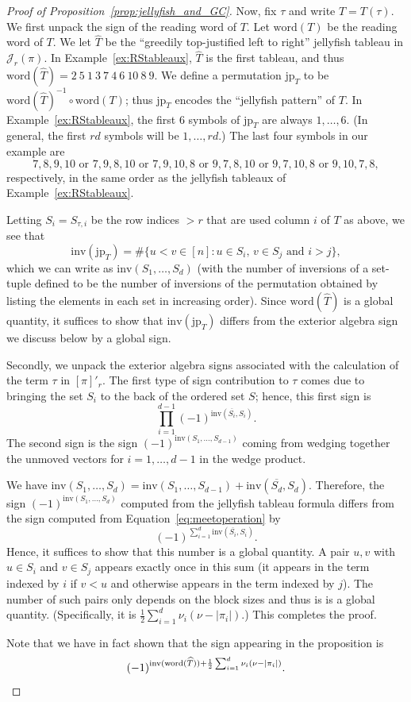 \documentclass[10pt]{amsart}
\theoremstyle{definition}
\theoremstyle{plain}
\theoremstyle{plain}
\theoremstyle{definition}
\theoremstyle{remark}
\theoremstyle{plain}
\theoremstyle{plain}
\theoremstyle{plain}
\numberwithin{equation}{section}
\newcommand{\jp}{\mathrm{jp}}
\newcommand{\word}{\mathrm{word}}
\newcommand{\inv}{\mathrm{inv}}
\begin{document}
\begin{proof}[Proof of Proposition~\ref{prop:jellyfish_and_GC}]
Now, fix $\tau$ and write $T = T(\tau)$. We first unpack the sign of the reading word of $T$. Let $\word(T)$ be the reading word of $T$. We let $\widehat{T}$ be the ``greedily top-justified left to right'' jellyfish tableau in $\mathcal{J}_r(\pi)$. In Example~\ref{ex:RStableaux}, $\widehat{T}$ is the first tableau, and thus $\word(\widehat{T}) = 2\ 5\ 1\ 3\ 7\ 4\ 6\ 10\ 8\ 9$. We define a permutation $\jp_T$ to be $\word(\widehat{T})^{-1} \circ \word(T)$; thus $\jp_T$ encodes the ``jellyfish pattern'' of $T$. 
In Example~\ref{ex:RStableaux}, the first $6$ symbols of $\jp_T$ are always $1,\dots,6$. (In general, the first $rd$ symbols will be $1, \dots, rd$.)
The last four symbols in our example are 
\[7,8,9,10 \text{ or } 7,9,8,10 \text{ or } 7,9,10,8 \text{ or } 9,7,8,10 \text{ or } 9,7,10,8 \text{ or } 9,10,7,8,\]
respectively, in the same order as the jellyfish tableaux of Example~\ref{ex:RStableaux}. 


Letting $S_i = S_{\tau, i}$ be the row indices $>r$ that are used column $i$ of $T$ as above, we see that
\begin{equation}
\inv(\jp_T) = \# \{u<v \in [n] \colon u \in S_i, \, v \in S_j \text{ and } i>j \},
\end{equation}
which we can write as $\inv(S_1,\dots,S_d)$ (with the number of inversions of a set-tuple defined to be the number of inversions of the permutation obtained by listing the elements in each set in increasing order). Since $\word(\widehat{T})$ is a global quantity, it suffices to show that $\inv(\jp_T)$ differs from the exterior algebra sign we discuss below by a global sign. 

Secondly, we unpack the exterior algebra signs associated with the calculation of the term $\tau$ in $[\pi]'_r$. The first type of sign contribution to $\tau$ comes due to bringing the set $S_i$ to the back of the ordered set $S$; hence, this  first sign is \[
\prod_{i=1}^{d-1} (-1)^{\inv(\overline{S_i},S_i)}.
\]
The second sign is the sign  $(-1)^{\inv(S_1,\dots,S_{d-1})}$ coming from wedging together the unmoved vectors for $i=1,\dots,d-1$ in the wedge product. 

We have $\inv(S_1,\dots,S_{d}) = \inv(S_1,\dots,S_{d-1})+\inv(\overline{S_d}, S_{d})$. 
Therefore, the sign $(-1)^{\inv(S_1,\dots,S_{d})}$ computed from the jellyfish tableau formula differs from the sign computed from Equation~\eqref{eq:meetoperation} by
\[
(-1)^{\sum_{i=1}^d \inv(\overline{S_i}, S_{i})}.
\]
Hence, it suffices to show that this number is a global quantity. A pair $u,v$ with $u \in S_i$ and $v \in S_j$ appears exactly once in this sum (it appears in the term indexed by $i$ if $v<u$ and otherwise appears in the term indexed by $j$). The number of such pairs only depends on the block sizes and thus is is a global quantity. (Specifically, it is $\frac{1}{2} \sum_{i=1}^d \nu_i(\nu-|\pi_i|)$.) This completes the proof.

Note that we have in fact shown that the sign appearing in the proposition is \[(-1)^{\inv(\word(\widehat{T})) + \frac{1}{2} \sum_{i=1}^d \nu_i(\nu-|\pi_i|) }. \qedhere\]
\end{proof}
\end{document}
